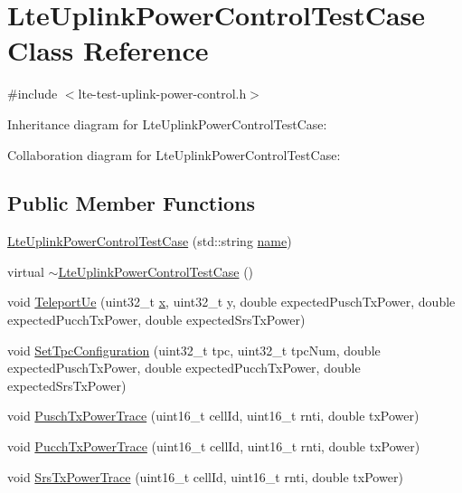 \hypertarget{classLteUplinkPowerControlTestCase}{}\section{Lte\+Uplink\+Power\+Control\+Test\+Case Class Reference}
\label{classLteUplinkPowerControlTestCase}


{\ttfamily \#include $<$lte-\/test-\/uplink-\/power-\/control.\+h$>$}



Inheritance diagram for Lte\+Uplink\+Power\+Control\+Test\+Case\+:


Collaboration diagram for Lte\+Uplink\+Power\+Control\+Test\+Case\+:
\subsection*{Public Member Functions}
\begin{DoxyCompactItemize}
\item 
\hyperlink{classLteUplinkPowerControlTestCase_ac1aac9206ce30c28f80107fea71c8e8c}{Lte\+Uplink\+Power\+Control\+Test\+Case} (std\+::string \hyperlink{generate__test__data__lte__spectrum__model_8m_ab74e6bf80237ddc4109968cedc58c151}{name})
\item 
virtual \hyperlink{classLteUplinkPowerControlTestCase_a920eb08d5f1443083e07538b2820bc56}{$\sim$\+Lte\+Uplink\+Power\+Control\+Test\+Case} ()
\item 
void \hyperlink{classLteUplinkPowerControlTestCase_a97a59d65135bb418dd2aaabd673c5da0}{Teleport\+Ue} (uint32\+\_\+t \hyperlink{lte__link__budget__x2__handover__measures_8m_a9336ebf25087d91c818ee6e9ec29f8c1}{x}, uint32\+\_\+t y, double expected\+Pusch\+Tx\+Power, double expected\+Pucch\+Tx\+Power, double expected\+Srs\+Tx\+Power)
\item 
void \hyperlink{classLteUplinkPowerControlTestCase_a91e2e46a5fa22677a33d5328ac9789b8}{Set\+Tpc\+Configuration} (uint32\+\_\+t tpc, uint32\+\_\+t tpc\+Num, double expected\+Pusch\+Tx\+Power, double expected\+Pucch\+Tx\+Power, double expected\+Srs\+Tx\+Power)
\item 
void \hyperlink{classLteUplinkPowerControlTestCase_abf25238690e93ded80b869c8214ac61b}{Pusch\+Tx\+Power\+Trace} (uint16\+\_\+t cell\+Id, uint16\+\_\+t rnti, double tx\+Power)
\item 
void \hyperlink{classLteUplinkPowerControlTestCase_a90d445a18fcc4c2792de172ebba3685f}{Pucch\+Tx\+Power\+Trace} (uint16\+\_\+t cell\+Id, uint16\+\_\+t rnti, double tx\+Power)
\item 
void \hyperlink{classLteUplinkPowerControlTestCase_a8dd71129f09e5e5f76caae70c320deb0}{Srs\+Tx\+Power\+Trace} (uint16\+\_\+t cell\+Id, uint16\+\_\+t rnti, double tx\+Power)
\end{DoxyCompactItemize}
